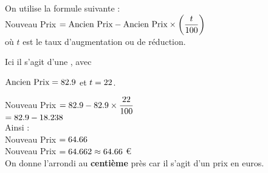 \documentclass[12pt]{article}
\begin{document}
{\begin{multicols}{2}
    \def\afficherresultat{
        \ifthenelse{\equal{\calculation}{\rounded}}
        {Nouveau Prix $= \num{\rounded}$\\ } %
        {Nouveau Prix $= \num{\calculation} \approx \num{\rounded}$ \euro{}\\
        On donne l'arrondi au \textbf{centième} près car il s'agit d'un prix en euros.}
    }
    \checkaugmentation
    On utilise la formule suivante : \\
    
    Nouveau Prix $= \text{Ancien Prix} - \text{Ancien Prix} \times \left( \dfrac{t}{100}\right)  $ \\
    
    où $t$ est le taux d'augmentation ou de réduction.
    
    Ici il s'agit d'une \operation, avec
    
    $\text{Ancien Prix} = \num{82.9}$ et $t = \num{\fpeval{abs(\augmentation)}}$.
    
    \columnbreak
    
    Nouveau Prix $= \num{\na} \sign \num{\na} \times \dfrac{\num{\fpeval{abs(\augmentation)}}}{100}$\\
    
    \phantom{Nouveau Prix} $=\num{\na} \sign \num{\fpeval{\na * abs(\augmentation) / 100}} $\\
    
    Ainsi  :\\
    \afficherresultat
    
\end{multicols}
}
\end{document}
